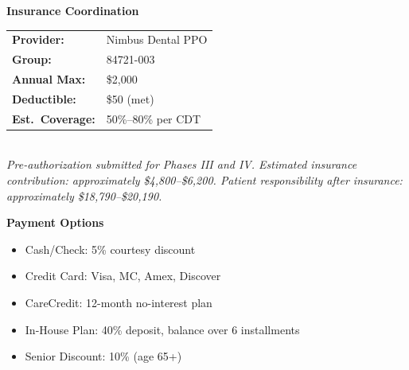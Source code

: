 \documentclass[11pt,a4paper]{article}
\begin{document}
\begin{minipage}[t]{0.56\textwidth}
  \begin{highlightbox}
    {\bfseries\color{primary}Insurance Coordination}\\[2mm]
    \begin{tabular}{@{}L{3cm} L{4cm}@{}}
      \textbf{Provider:} & Nimbus Dental PPO\\
      \textbf{Group:} & 84721-003\\
      \textbf{Annual Max:} & \$2{,}000\\
      \textbf{Deductible:} & \$50 (met)\\
      \textbf{Est.\ Coverage:} & 50\%--80\% per CDT\\
    \end{tabular}\\[2mm]
    \small\textit{Pre-authorization submitted for Phases III and IV. Estimated insurance contribution: approximately \$4{,}800--\$6{,}200. Patient responsibility after insurance: approximately \$18{,}790--\$20{,}190.}
  \end{highlightbox}
\end{minipage}\hfill%
\begin{minipage}[t]{0.42\textwidth}
  \begin{highlightbox}[colback=secondary!8, colframe=secondary!50]
    {\bfseries\color{secondary!80!black}Payment Options}\\[2mm]
    \begin{itemize}[nosep, leftmargin=*, itemsep=1pt]
      \item Cash/Check: 5\% courtesy discount
      \item Credit Card: Visa, MC, Amex, Discover
      \item CareCredit: 12-month no-interest plan
      \item In-House Plan: 40\% deposit, balance over 6 installments
      \item Senior Discount: 10\% (age 65+)
    \end{itemize}
  \end{highlightbox}
\end{minipage}

\vspace{4mm}
\end{document}
